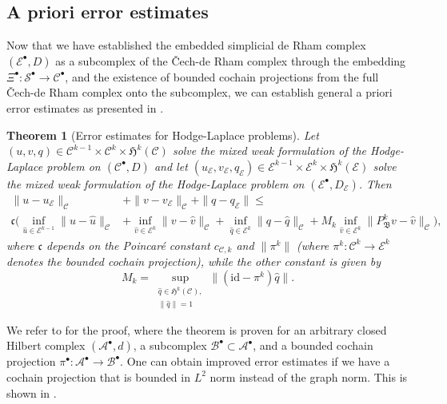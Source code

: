 \documentclass[reqno]{amsart}
\numberwithin{equation}{section}
\newtheorem{theorem}{Theorem}[section]
\theoremstyle{definition}
\newcommand{\Ac}{\mathcal{A}}
\newcommand{\Bc}{\mathcal{B}}
\newcommand{\Cc}{\mathcal{C}}
\newcommand{\Ec}{\mathcal{E}}
\newcommand{\Sc}{\mathcal{S}}
\newcommand{\Hf}{\mathfrak{H}}
\begin{document}
\subsection{A priori error estimates}
Now that we have established the embedded simplicial de Rham complex $(\Ec^\bullet, D)$ as a subcomplex of the \v{C}ech-de Rham complex through the embedding $\Xi^\bullet: \Sc^\bullet \to \Cc^\bullet$, and the existence of bounded cochain projections from the full \v{C}ech-de Rham complex onto the subcomplex, we can establish general a priori error estimates as presented in \cite{arnoldFEEC}.

\begin{theorem}[Error estimates for Hodge-Laplace problems]\label{theorem: a priori}
Let $(u, v, q) \in \Cc^{k-1} \times \Cc^{k} \times \Hf^k(\Cc)$ solve the mixed weak formulation of the Hodge-Laplace problem on $(\Cc^\bullet, D)$ and let $(u_\Ec, v_\Ec, q_\Ec) \in \Ec^{k-1} \times \Ec^k \times \Hf^k(\Ec)$ solve the mixed weak formulation of the Hodge-Laplace problem on $(\Ec^\bullet, D_\Ec)$. Then
\begin{subequations}
\label{eq: a priori error estimates}
\begin{align}
\|u - u_\Ec\|_{\Cc} &+ \|v - v_\Ec\|_{\Cc} + \|q - q_\Ec\| \leq \\
 \mathfrak{c} \Big( \inf_{\hat{u} \in \Ec^{k-1}} \|u - \hat{u}\|_\Cc &+ \inf_{\hat{v} \in \Ec^{k}} \|v - \hat{v}\|_\Cc + \inf_{\hat{q} \in \Ec^k} \|q - \hat{q}\|_\Cc  + M_k \inf_{\hat{v} \in \Ec^k} \|P_{\mathfrak{B}}^k v - \hat{v}\|_\Cc \Big),
\end{align}
\end{subequations}
where $\mathfrak{c}$ depends on the Poincaré constant $c_{\Cc,k}$ and $\|\pi^k\|$ (where $\pi^k: \Cc^k \to \Ec^k$ denotes the bounded cochain projection), while the other constant is given by
\begin{equation}\label{eq: bound in harmonic forms}
M_k = \sup_{\substack{\hat{q} \in \Hf^k(\Cc), \\ \|\hat{q} \|=1}} \|(\mathrm{id} - \pi^k) \hat{q} \|. 
\end{equation}
\end{theorem}
We refer to \cite[Section 5.2]{arnoldFEEC} for the proof, where the theorem is proven for an arbitrary closed Hilbert complex $(\Ac^\bullet,d)$, a subcomplex $\Bc^\bullet \subset \Ac^\bullet$, and a bounded cochain projection $\pi^\bullet: \Ac^\bullet \to \Bc^\bullet$. One can obtain improved error estimates if we have a cochain projection that is bounded in $L^2$ norm instead of the graph norm. This is shown in \cite{arnoldFEEC3}. 
\end{document}

